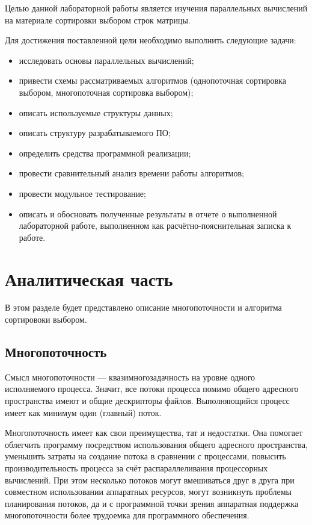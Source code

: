\documentclass[a4paper,14pt, unknownkeysallowed]{extreport}
\begin{document}
Целью данной лабораторной работы является изучения параллельных вычислений на материале сортировки выбором строк матрицы.

Для достижения поставленной цели необходимо выполнить следующие задачи:

\begin{itemize}
	\item исследовать основы параллельных вычислений;
	\item привести схемы рассматриваемых алгоритмов (однопоточная сортировка выбором, многопоточная сортировка выбором);
	\item описать используемые структуры данных;
	\item описать структуру разрабатываемого ПО;
	\item определить средства программной реализации;
	\item провести сравнительный анализ времени работы алгоритмов;
	\item провести модульное тестирование;
	\item описать и обосновать полученные результаты в отчете о выполненной лабораторной работе, выполненном как расчётно-пояснительная
	записка к работе.
\end{itemize}





\chapter{Аналитическая часть}
В этом разделе будет представлено описание многопоточности и алгоритма сортировоки выбором.

\section{Многопоточность}

Смысл многопоточности — квазимногозадачность на уровне одного исполняемого процесса.
Значит, все потоки процесса помимо общего адресного пространства имеют и общие дескрипторы файлов. Выполняющийся процесс имеет как минимум один (главный) поток.

Многопоточность имеет как свои преимущества, тат и недостатки. Она помогает облегчить программу посредством использования общего адресного пространства, уменьшить затраты на создание потока в 
сравнении с процессами, повысить производительность процесса за счёт распараллеливания процессорных вычислений. При этом несколько потоков могут вмешиваться друг в друга при совместном использовании аппаратных ресурсов, могут возникнуть проблемы планирования потоков, да и с программной точки зрения аппаратная поддержка многопоточности более трудоемка для программного обеспечения.
\end{document}
